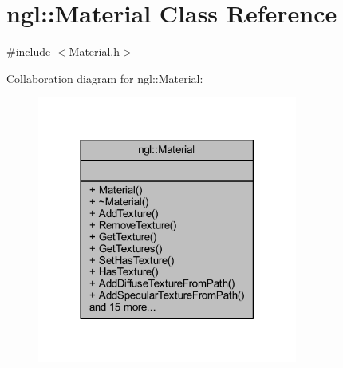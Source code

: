 \hypertarget{classngl_1_1_material}{}\section{ngl\+:\+:Material Class Reference}
\label{classngl_1_1_material}


{\ttfamily \#include $<$Material.\+h$>$}



Collaboration diagram for ngl\+:\+:Material\+:
\nopagebreak
\begin{figure}[H]
\begin{center}
\leavevmode
\includegraphics[width=242pt]{classngl_1_1_material__coll__graph}
\end{center}
\end{figure}
